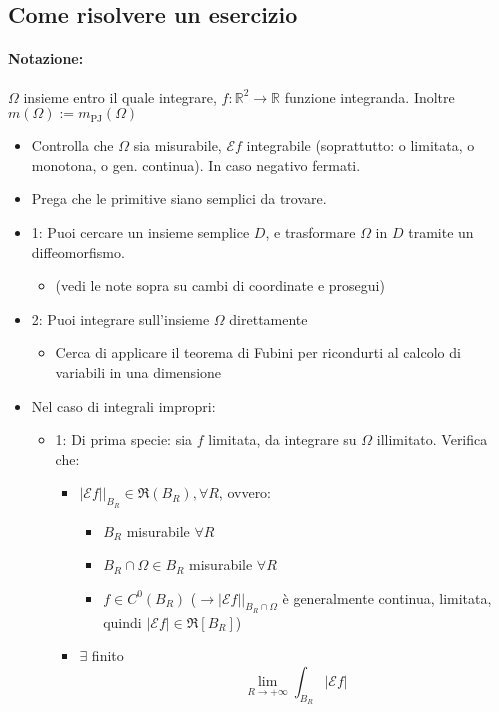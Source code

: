 \documentclass[a4paper,12pt]{book}
\begin{document}
\subsection{Come risolvere un esercizio}
\paragraph{Notazione:}
$\Omega$ insieme entro il quale integrare, $f:\mathbb{R}^2\rightarrow\mathbb{R}$ funzione integranda.
Inoltre $m(\Omega) := m_{\mathrm{PJ}}(\Omega)$
\begin{itemize}
 \item Controlla che $\Omega$ sia misurabile, $\mathcal{E}f$ integrabile (soprattutto: o limitata, o monotona, o gen. continua). In caso negativo fermati.
 \item Prega che le primitive siano semplici da trovare.
 \item 1: Puoi cercare un insieme semplice $D$, e trasformare $\Omega$ in $D$ tramite un diffeomorfismo.
 \begin{itemize}
  \item (vedi le note sopra su cambi di coordinate e prosegui)
 \end{itemize}
 \item 2: Puoi integrare sull'insieme $\Omega$ direttamente
 \begin{itemize}
  \item Cerca di applicare il teorema di Fubini per ricondurti al calcolo di variabili in una dimensione
 \end{itemize}
 \item Nel caso di integrali impropri:
 \begin{itemize}
  \item 1: Di prima specie: sia $f$ limitata, da integrare su $\Omega$ illimitato. Verifica che:
  \begin{itemize}
   \item $|\mathcal{E}f||_{B_R} \in \Re(B_R), \forall R$, ovvero:
   \begin{itemize}
    \item $B_R$ misurabile $\forall R$
    \item $B_R \cap \Omega \in B_R $ misurabile $\forall R$
    \item $f \in C^0(B_R)$ ($\rightarrow |\mathcal{E}f||_{B_R\cap\Omega}$ è generalmente continua, limitata, quindi $|\mathcal{E}f| \in \Re[B_R]$)
   \end{itemize}
   \item $\exists$ finito $$\lim_{R \to +\infty} \int_{B_R} |\mathcal{E}f| $$

\end{itemize}
\end{itemize}
\end{itemize}
\end{document}
